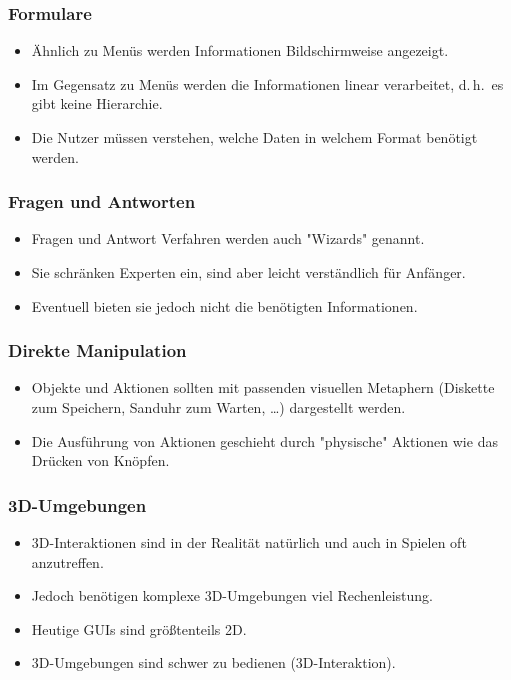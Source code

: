 \documentclass[a4paper, 11pt, accentcolor = tud3b]{tudreport}
\renewcommand{\dh}{d.\,h.~}
\begin{document}
				\subsubsection{Formulare}
					\begin{itemize}
						\item Ähnlich zu Menüs werden Informationen Bildschirmweise angezeigt.
						\item Im Gegensatz zu Menüs werden die Informationen linear verarbeitet, \dh es gibt keine Hierarchie.
						\item Die Nutzer müssen verstehen, welche Daten in welchem Format benötigt werden.
					\end{itemize}

				\subsubsection{Fragen und Antworten}
					\begin{itemize}
						\item Fragen und Antwort Verfahren werden auch "Wizards" genannt.
						\item Sie schränken Experten ein, sind aber leicht verständlich für Anfänger.
						\item Eventuell bieten sie jedoch nicht die benötigten Informationen.
					\end{itemize}

				\subsubsection{Direkte Manipulation}
					\begin{itemize}
						\item Objekte und Aktionen sollten mit passenden visuellen Metaphern (Diskette zum Speichern, Sanduhr zum Warten, \dots) dargestellt werden.
						\item Die Ausführung von Aktionen geschieht durch "physische" Aktionen wie das Drücken von Knöpfen.
					\end{itemize}

				\subsubsection{3D-Umgebungen}
					\begin{itemize}
						\item 3D-Interaktionen sind in der Realität natürlich und auch in Spielen oft anzutreffen.
						\item Jedoch benötigen komplexe 3D-Umgebungen viel Rechenleistung.
						\item Heutige GUIs sind größtenteils 2D.
						\item 3D-Umgebungen sind schwer zu bedienen (3D-Interaktion).
					\end{itemize}
\end{document}
